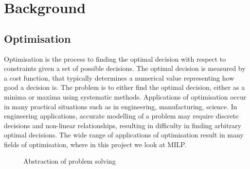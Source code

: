 \chapter{Background}

\section{Optimisation}

Optimisation is the process to finding the optimal decision with respect to constraints given a set of possible decisions. The optimal decision is measured by a cost function, that typically determines a numerical value representing how good a decision is. The problem is to either find the optimal decision, either as a minima or maxima using systematic methods. Applications of optimisation occur in many practical situations such as in engineering, manufacturing, science. In engineering applications, accurate modelling of a problem may require discrete decisions and non-linear relationships, resulting in difficulty in finding arbitrary optimal decisions. The wide range of applications of optimisation result in  many fields of optimisation, where in this project we look at MILP.

\begin{figure}[H]
	\begin{center}
	\end{center}
	\caption{Abstraction of problem solving}
\end{figure}

